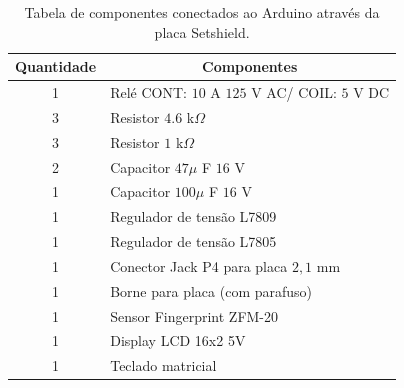   
  \begin{table}[]
\centering
\caption{Tabela de componentes conectados ao Arduino através da placa Setshield.}
\label{tabela_componentes}
\begin{tabular}{ll}
\hline
\multicolumn{1}{c}{\textbf{Quantidade}} & \multicolumn{1}{c}{\textbf{Componentes}} \\ \hline\hline
\multicolumn{1}{c}{1} & Relé CONT: $10$ A $125$ V AC/ COIL: $5$ V DC\\ \hline
\multicolumn{1}{c}{3} & Resistor $4.6$ k$\Omega$ \\ \hline
\multicolumn{1}{c}{3} & Resistor $1$ k$\Omega$\\ \hline
\multicolumn{1}{c}{2} & Capacitor $47 \mu$ F $16$ V\\ \hline
\multicolumn{1}{c}{1} & Capacitor $100 \mu$ F $16$ V\\ \hline
\multicolumn{1}{c}{1} & Regulador de tensão L7809\\ \hline
\multicolumn{1}{c}{1} & Regulador de tensão L7805\\ \hline
\multicolumn{1}{c}{1} & Conector Jack P4 para placa $2,1$ mm\\ \hline
\multicolumn{1}{c}{1} & Borne para placa (com parafuso)\\ \hline
\multicolumn{1}{c}{1} & Sensor Fingerprint ZFM-20\\ \hline
\multicolumn{1}{c}{1} & Display LCD 16x2 5V\\ \hline
\multicolumn{1}{c}{1} & Teclado matricial\\ \hline


\end{tabular}
\end{table}

  
  
